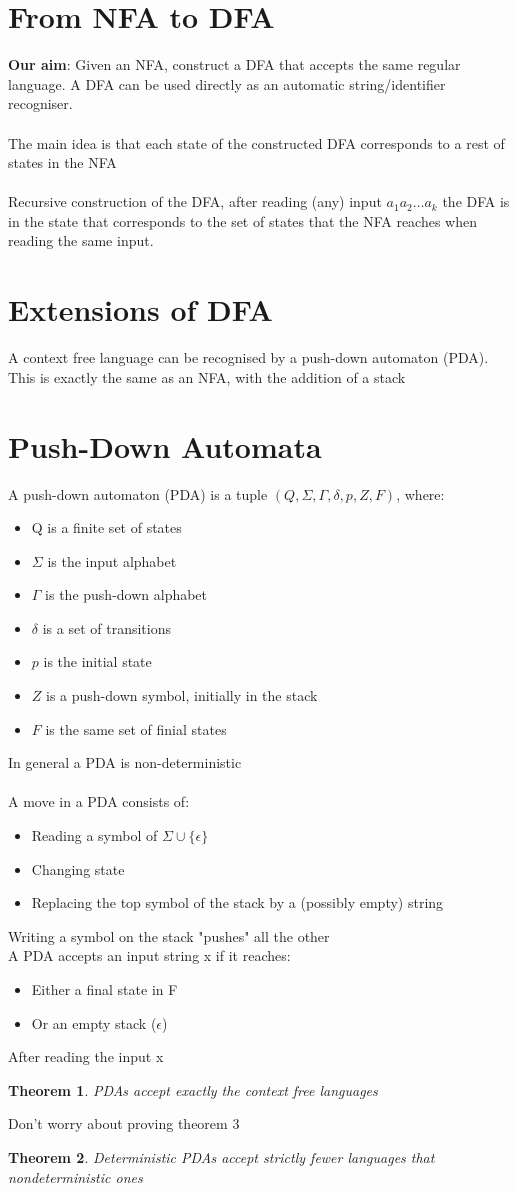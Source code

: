 \documentclass{article}[18pt]
\newtheorem{theorem}{Theorem}
\begin{document}
\section{From NFA to DFA}
\textbf{Our aim}: Given an NFA, construct a DFA that accepts the same regular language. A DFA can be used directly as an automatic string/identifier recogniser.\\
\\
The main idea is that each state of the constructed DFA corresponds to a rest of states in the NFA\\
\\
Recursive construction of the DFA, after reading (any) input $a_1a_2\ldots a_k$ the DFA is in the state that corresponds to the set of states that the NFA reaches when reading the same input.
\section{Extensions of DFA}
A context free language can be recognised by a push-down automaton (PDA). This is exactly the same as an NFA, with the addition of a stack
\newpage
\section{Push-Down Automata}
A push-down automaton (PDA) is a tuple $(Q,\Sigma, \Gamma, \delta, p, Z, F)$, where:
\begin{itemize}
	\item Q is a finite set of states
	\item $\Sigma$ is the input alphabet
	\item $\Gamma$ is the push-down alphabet
	\item $\delta$ is a set of transitions
	\item $p$ is the initial state
	\item $Z$ is a push-down symbol, initially in the stack
	\item $F$ is the same set of finial states
\end{itemize}
In general a PDA is non-deterministic\\
\\
A move in a PDA consists of:
\begin{itemize}
	\item Reading a symbol of $\Sigma \cup \{\epsilon\}$
	\item Changing state
	\item Replacing the top symbol of the stack by a (possibly empty) string
\end{itemize}
Writing a symbol on the stack "pushes" all the other\\
A PDA accepts an input string x if it reaches:
\begin{itemize}
	\item Either a final state in F
	\item Or an empty stack ($\epsilon$)
\end{itemize}
After reading the input x
\begin{theorem}
	PDAs accept exactly the context free languages
\end{theorem}
Don't worry about proving theorem 3

\begin{theorem}
	Deterministic PDAs accept strictly fewer languages that nondeterministic ones
\end{theorem}
\end{document}
